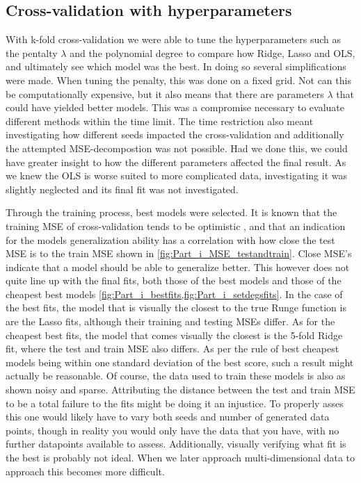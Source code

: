 \documentclass[reprint,english,notitlepage]{revtex4-2}  %
\begin{document}
\subsection{Cross-validation with hyperparameters} %

With k-fold cross-validation we were able to tune the hyperparameters such as the pentalty $\lambda$ and the polynomial degree to compare how Ridge, Lasso and OLS, and ultimately see which model was the best. In doing so several simplifications were made. When tuning the penalty, this was done on a fixed grid. Not can this be computationally expensive, but it also means that there are parameters $\lambda$ that could have yielded better models. This was a compromise necessary to evaluate different methods within the time limit. The time restriction also meant investigating how different seeds impacted the cross-validation and additionally the attempted MSE-decompostion was not possible. Had we done this, we could have greater insight to how the different parameters affected the final result. As we knew the OLS is worse suited to more complicated data, investigating it was slightly neglected and its final fit was not investigated.

Through the training process, best models were selected. It is known that the training MSE of cross-validation tends to be  optimistic \cite{hastie2009}, and that an indication for the models generalization ability has a correlation with how close the test MSE is to the train MSE shown in \cref{fig:Part_i_MSE_testandtrain}. Close MSE's indicate that a model should be able to generalize better. This however does not quite line up with the final fits, both those of the best models and those of the cheapest best models \cref{fig:Part_i_bestfits,fig:Part_i_setdegsfits}. In the case of the best fits, the model that is visually the closest to the true Runge function is are the Lasso fits, although their training and testing MSEs differ. As for the cheapest best fits, the model that comes visually the closest is the 5-fold Ridge fit, where the test and train MSE also differs. As per the rule of best cheapest models being within one standard deviation of the best score, such a result might actually be reasonable.
Of course, the data used to train these models is also as shown noisy and sparse. Attributing the distance between the test and train MSE to be a total failure to the fits might be doing it an injustice. To properly asses this one would likely have to vary both seeds and number of generated data points, though in reality you would only have the data that you have, with no further datapoints available to assess. Additionally, visually verifying what fit is the best is probably not ideal. When we later approach multi-dimensional data to approach this becomes more difficult.  
\end{document}
